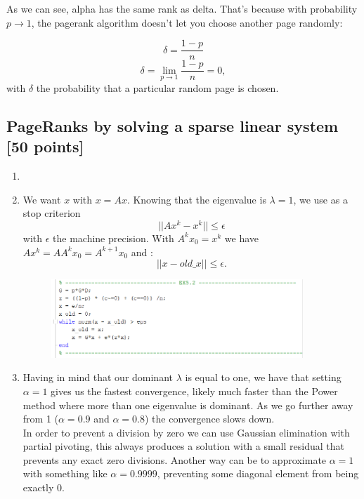 \documentclass[unicode,11pt,a4paper,oneside,numbers=endperiod,openany]{scrartcl}
\begin{document}
\begin{enumerate}
    As we can see, alpha has the same rank as delta. That's because with probability \( p \rightarrow 1 \), the pagerank algorithm doesn’t let you choose another page randomly:
    
    \[ \delta = \frac{1 - p}{n} \]
    \[ \delta =\lim_{p\rightarrow 1} \frac{1 - p}{n} = 0, \]
    with $\delta$ the probability that a particular random page is chosen.
    
\end{enumerate}


\subsection{PageRanks by solving a sparse linear system [50 points]}

\begin{enumerate}

    \item \checkmark
    
    \item We want $x$ with $x = Ax$. Knowing that the eigenvalue is $\lambda = 1$, we use as a stop criterion
    \[|| Ax^k - x^k ||\leq \epsilon\] with $\epsilon$ the machine precision. With \( A^k x_0 = x^k \) we have \( Ax^k = AA^k x_0 = A^{k+1}x_0 \) and : \[|| x - old\_x ||\leq \epsilon.\]  
    
    \begin{figure}[H]
    \centering
    
    \includegraphics[width=0.9\textwidth]{ex5_2.png}
    \end{figure}
    
    \item Having in mind that our dominant $\lambda$ is equal to one, we have that setting $\alpha = 1$ gives us the fastest convergence, likely much faster than the Power method where more than one eigenvalue is dominant. As we go further away from 1 ($\alpha = 0.9$ and $\alpha = 0.8$) the convergence slows down.\\
    In order to prevent a division by zero we can use Gaussian elimination with partial pivoting, this always produces a solution with a small residual that prevents any exact zero divisions. Another way can be to approximate $\alpha = 1$ with something like $\alpha = 0.9999$, preventing some diagonal element from being exactly 0.
    

\end{enumerate}
\end{document}
